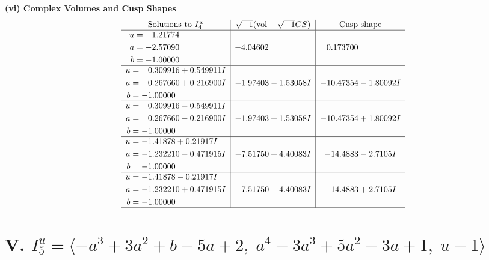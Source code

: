 \documentclass[1p]{elsarticle_modified}
\theoremstyle{definition}
\newcommand{\I}{\sqrt{-1}}
\begin{document}
\newpage\flushleft \textbf{(vi) Complex Volumes and Cusp Shapes}
$$\begin{array}{c|c|c}  
\text{Solutions to }I^u_{4}& \I (\text{vol} + \sqrt{-1}CS) & \text{Cusp shape}\\
 \hline 
\begin{aligned}
u &= \phantom{-}1.21774\phantom{ +0.000000I} \\
a &= -2.57090\phantom{ +0.000000I} \\
b &= -1.00000\phantom{ +0.000000I}\end{aligned}
 & -4.04602\phantom{ +0.000000I} & \phantom{-}0.173700\phantom{ +0.000000I} \\ \hline\begin{aligned}
u &= \phantom{-}0.309916 + 0.549911 I \\
a &= \phantom{-}0.267660 + 0.216900 I \\
b &= -1.00000\phantom{ +0.000000I}\end{aligned}
 & -1.97403 - 1.53058 I & -10.47354 - 1.80092 I \\ \hline\begin{aligned}
u &= \phantom{-}0.309916 - 0.549911 I \\
a &= \phantom{-}0.267660 - 0.216900 I \\
b &= -1.00000\phantom{ +0.000000I}\end{aligned}
 & -1.97403 + 1.53058 I & -10.47354 + 1.80092 I \\ \hline\begin{aligned}
u &= -1.41878 + 0.21917 I \\
a &= -1.232210 - 0.471915 I \\
b &= -1.00000\phantom{ +0.000000I}\end{aligned}
 & -7.51750 + 4.40083 I & -14.4883 - 2.7105 I \\ \hline\begin{aligned}
u &= -1.41878 - 0.21917 I \\
a &= -1.232210 + 0.471915 I \\
b &= -1.00000\phantom{ +0.000000I}\end{aligned}
 & -7.51750 - 4.40083 I & -14.4883 + 2.7105 I\\
 \hline 
 \end{array}$$\newpage\newpage\renewcommand{\arraystretch}{1}
\centering \section*{V. $I^u_{5}= \langle - a^3+3 a^2+b-5 a+2,\;a^4-3 a^3+5 a^2-3 a+1,\;u-1 \rangle$}
\end{document}
